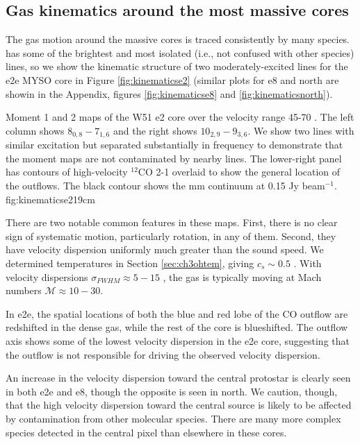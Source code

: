 \documentclass[twocolumn]{aastex61}
\begin{document}
\subsection{Gas kinematics around the most massive cores}
\label{sec:kinematics}
The gas motion around the massive cores is traced consistently by many species.
\methanol has some of the brightest and most isolated (i.e., not confused with
other species) lines, so we show the kinematic structure of two
moderately-excited \methanol lines for the e2e MYSO core in Figure
\ref{fig:kinematicse2} (similar plots for e8 and north are showin in the
Appendix, figures \ref{fig:kinematicse8} and \ref{fig:kinematicsnorth}).

{Moment 1 and 2 maps of the W51 e2 core over the velocity
range 45-70 \kms.  The left column shows \methanol $8_{0,8}-7_{1,6}$
and the right shows \methanol $10_{2,9}-9_{3,6}$.  We show two
lines with similar excitation but separated substantially in frequency
to demonstrate that the moment maps are not contaminated by nearby lines.
The lower-right panel has contours of high-velocity $^{12}$CO 2-1 overlaid
to show the general location of the outflows.  The black contour shows
the mm continuum at 0.15 Jy beam$^{-1}$.}
{fig:kinematicse2}{1}{9cm}


There are two notable common features in these maps. First, there is no clear
sign of systematic motion, particularly rotation, in any of them.  Second, they
have velocity dispersion uniformly much greater than the sound speed.  We
determined temperatures in Section \ref{sec:ch3ohtem}, giving
$c_s\sim0.5$ \kms.  With velocity dispersions $\sigma_{FWHM}\approx5-15$ \kms,
the gas is typically moving at Mach numbers $\mathcal{M}\approx10-30$.


In e2e, the spatial locations of both the blue and red lobe of the CO outflow
are redshifted in the dense gas, while the rest of the core is blueshifted.
The outflow axis shows some of the lowest velocity dispersion in the e2e core,
suggesting that the outflow is not responsible for driving the observed
velocity dispersion.

An increase in the velocity dispersion toward the central protostar is clearly
seen in both e2e and e8, though the opposite is seen in north.  We caution,
though, that the high velocity dispersion toward the central source is likely
to be affected by contamination from other molecular species.  There are many
more complex species detected in the central pixel than elsewhere in these
cores.
\end{document}
